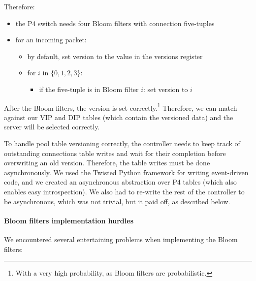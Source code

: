\documentclass[11pt,oneside,a4paper]{article}
\begin{document}
Therefore:

\begin{itemize}
\item the P4 switch needs four Bloom filters with connection five-tuples
\item for an incoming packet:
    \begin{itemize}
    \item by default, set version to the value in the versions register
    \item for $i$ in $\{0,1,2,3\}$:
        \begin{itemize}
        \item if the five-tuple is in Bloom filter $i$: set version to $i$
        \end{itemize}
    \end{itemize}
\end{itemize}

After the Bloom filters, the version is set correctly.\footnote{%
With a very high probability, as Bloom filters are probabilistic.}
Therefore, we can match against our VIP and DIP tables (which contain the
versioned data) and the server will be selected correctly.

To handle pool table versioning correctly, the controller needs to keep track of
outstanding connections table writes and wait for their completion before
overwriting an old version.
Therefore, the table writes must be done asynchronously.
We used the Twisted Python framework\cite{twisted} for writing event-driven
code, and we created an asynchronous abstraction over P4 tables (which also
enables easy introspection).
We also had to re-write the rest of the controller to be asynchronous, which was
not trivial, but it paid off, as described below.

\paragraph{Bloom filters implementation hurdles}

We encountered several entertaining problems when implementing the Bloom filters:
\end{document}
